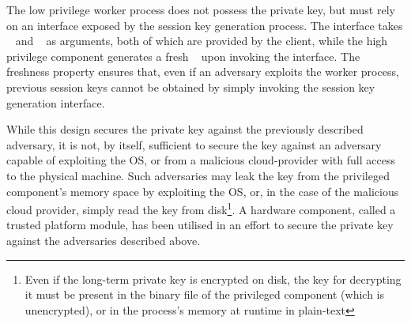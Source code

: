 \documentclass[../main.tex]{subfiles}
\begin{document}
The low privilege worker process does not possess the private key, but
must rely on an interface exposed by the session key generation
process. The interface takes \crandom~ and \premaster~ as arguments,
both of which are provided by the client, while the high privilege
component generates a fresh \srandom~ upon invoking the interface. The
freshness property ensures that, even if an adversary exploits the
worker process, previous session keys cannot be obtained by simply
invoking the session key generation interface.

While this design secures the private key against the previously
described adversary, it is not, by itself, sufficient to secure the
key against an adversary capable of exploiting the OS, or from a
malicious cloud-provider with full access to the physical machine.
Such adversaries may leak the key from the privileged component's
memory space by exploiting the OS, or, in the case of the malicious
cloud provider, simply read the key from disk\footnote{Even if the
  long-term private key is encrypted on disk, the key for decrypting
  it must be present in the binary file of the privileged component
  (which is unencrypted), or in the process's memory at runtime in
  plain-text}. A hardware component, called a trusted platform module,
has been utilised in an effort to secure the private key against the
adversaries described above.
\end{document}
